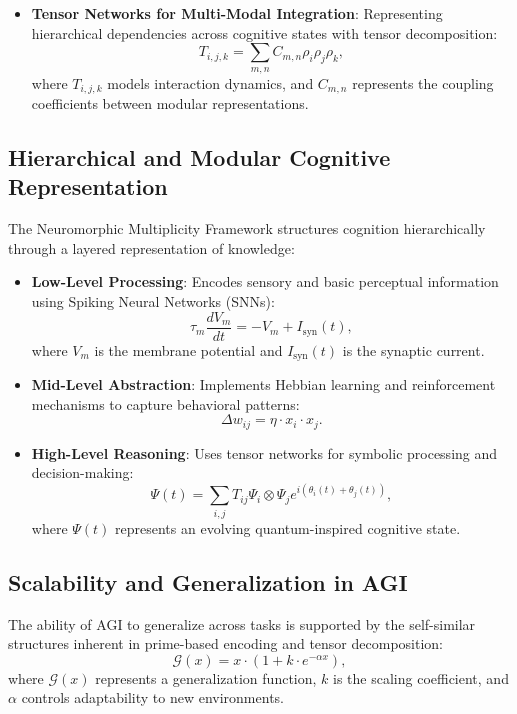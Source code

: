 \documentclass{article}
\theoremstyle{plain}
\begin{document}
\begin{itemize}
\begin{itemize}
\begin{itemize}
    \item \textbf{Tensor Networks for Multi-Modal Integration}: Representing hierarchical dependencies across cognitive states with tensor decomposition:
    \begin{equation}
        T_{i,j,k} = \sum_{m,n} C_{m,n} \rho_i \rho_j \rho_k,
    \end{equation}
    where $T_{i,j,k}$ models interaction dynamics, and $C_{m,n}$ represents the coupling coefficients between modular representations.
\end{itemize}

\subsection{Hierarchical and Modular Cognitive Representation}
The Neuromorphic Multiplicity Framework structures cognition hierarchically through a layered representation of knowledge:
\begin{itemize}
    \item \textbf{Low-Level Processing}: Encodes sensory and basic perceptual information using Spiking Neural Networks (SNNs):
    \begin{equation}
        \tau_m \frac{dV_m}{dt} = - V_m + I_{\text{syn}}(t),
    \end{equation}
    where $V_m$ is the membrane potential and $I_{\text{syn}}(t)$ is the synaptic current.
    
    \item \textbf{Mid-Level Abstraction}: Implements Hebbian learning and reinforcement mechanisms to capture behavioral patterns:
    \begin{equation}
        \Delta w_{ij} = \eta \cdot x_i \cdot x_j.
    \end{equation}
    
    \item \textbf{High-Level Reasoning}: Uses tensor networks for symbolic processing and decision-making:
    \begin{equation}
        \Psi(t) = \sum_{i,j} T_{ij} \Psi_i \otimes \Psi_j e^{i(\theta_i(t) + \theta_j(t))},
    \end{equation}
    where $\Psi(t)$ represents an evolving quantum-inspired cognitive state.
\end{itemize}

\subsection{Scalability and Generalization in AGI}
The ability of AGI to generalize across tasks is supported by the self-similar structures inherent in prime-based encoding and tensor decomposition:
\begin{equation}
    \mathcal{G}(x) = x \cdot (1 + k \cdot e^{-\alpha x}),
\end{equation}
where $\mathcal{G}(x)$ represents a generalization function, $k$ is the scaling coefficient, and $\alpha$ controls adaptability to new environments.


\end{itemize}
\end{itemize}
\end{document}
